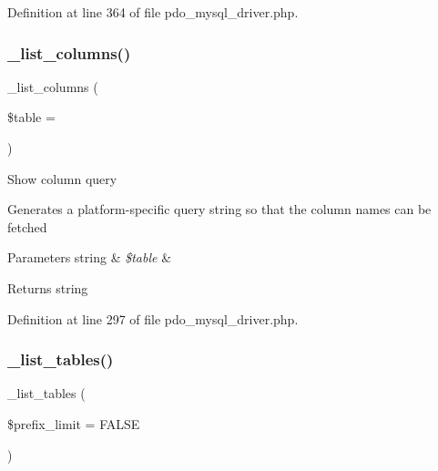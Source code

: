 Definition at line 364 of file pdo\+\_\+mysql\+\_\+driver.\+php.

\mbox{\label{class_c_i___d_b__pdo__mysql__driver_a7ccb7f9c301fe7f0a9db701254142b63}} 
\subsubsection{\texorpdfstring{\_list\_columns()}{\_list\_columns()}}
{\footnotesize\ttfamily \+\_\+list\+\_\+columns (\begin{DoxyParamCaption}\item[{}]{\$table = {\ttfamily \textquotesingle{}\textquotesingle{}} }\end{DoxyParamCaption})\hspace{0.3cm}{\ttfamily [protected]}}

Show column query

Generates a platform-\/specific query string so that the column names can be fetched


\begin{DoxyParams}[1]{Parameters}
string & {\em \$table} & \\
\hline
\end{DoxyParams}
\begin{DoxyReturn}{Returns}
string 
\end{DoxyReturn}


Definition at line 297 of file pdo\+\_\+mysql\+\_\+driver.\+php.

\mbox{\label{class_c_i___d_b__pdo__mysql__driver_a435c0f3ce54fe7daa178baa8532ebd54}} 
\subsubsection{\texorpdfstring{\_list\_tables()}{\_list\_tables()}}
{\footnotesize\ttfamily \+\_\+list\+\_\+tables (\begin{DoxyParamCaption}\item[{}]{\$prefix\+\_\+limit = {\ttfamily FALSE} }\end{DoxyParamCaption})\hspace{0.3cm}{\ttfamily [protected]}}

